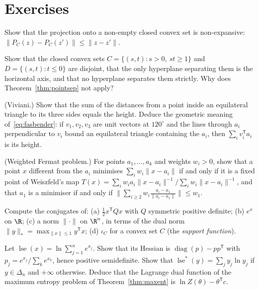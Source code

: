 \section{Exercises}

\begin{exercise}[$\star$]\label{ex:nonexpansive}
Show that the projection onto a non-empty closed convex set is non-expansive: $\|P_C(z)-P_C(z')\|\le\|z-z'\|$.
\end{exercise}

\begin{exercise}[$\star$]\label{ex:nostrict}
Show that the closed convex sets $C=\{(s,t):s>0,\ st\ge1\}$ and $D=\{(s,t):t\le0\}$ are disjoint, that the only hyperplane separating them is the horizontal axis, and that
no hyperplane separates them strictly. Why does Theorem~\ref{thm:pointsep} not apply?
\end{exercise}

\begin{exercise}[$\star\star$]\label{ex:viviani}
(Viviani.) Show that the sum of the distances from a point inside an equilateral triangle to its three sides equals the height. Deduce the geometric meaning
of~\eqref{eq:fasbender}: if $v_1,v_2,v_3$ are unit vectors at $120^\circ$ and the lines through $a_i$ perpendicular to $v_i$ bound an equilateral triangle containing the $a_i$, then
$\sum_iv_i^{\mathsf T}a_i$ is its height.
\end{exercise}

\begin{exercise}[$\star\star$]\label{ex:weiszfeld}
(Weighted Fermat problem.) For points $a_1,\dots,a_k$ and weights $w_i>0$, show that a point $x$ different from the $a_i$ minimises $\sum_iw_i\|x-a_i\|$ if and only if it is a fixed
point of Weiszfeld's map $T(x)=\sum_iw_ia_i\|x-a_i\|^{-1}/\sum_iw_i\|x-a_i\|^{-1}$, and that $a_1$ is a minimiser if and only if $\|\sum_{i\ge2}w_i\frac{a_i-a_1}{\|a_i-a_1\|}\|\le w_1$.
\end{exercise}

\begin{exercise}[$\star$]\label{ex:conjugates}
Compute the conjugates of: (a) $\frac12x^{\mathsf T}Qx$ with $Q$ symmetric positive definite; (b) $e^x$ on $\R$; (c) a norm $\|\cdot\|$ on $\R^n$, in terms of the dual norm
$\|y\|_*=\max_{\|x\|\le1}y^{\mathsf T}x$; (d) $\iota_C$ for a convex set $C$ (the \emph{support function}).
\end{exercise}

\begin{exercise}[$\star\star$]\label{ex:logsumexp}
Let $\operatorname{lse}(x)=\ln\sum_{j=1}^ne^{x_j}$. Show that its Hessian is $\operatorname{diag}(p)-pp^{\mathsf T}$ with $p_j=e^{x_j}/\sum_ke^{x_k}$, hence positive semidefinite. Show that
$\operatorname{lse}^*(y)=\sum_jy_j\ln y_j$ if $y\in\Delta_n$ and $+\infty$ otherwise. Deduce that the Lagrange dual function of the maximum entropy problem of Theorem~\ref{thm:maxent} is
$\ln Z(\theta)-\theta^{\mathsf T}c$.
\end{exercise}

